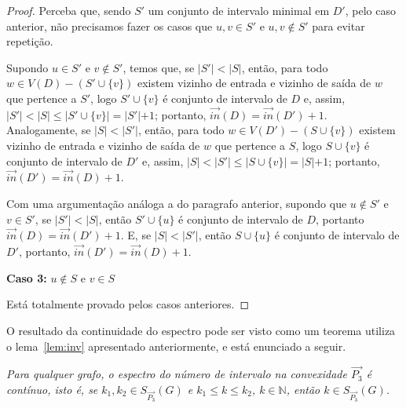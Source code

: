 \begin{proof}
    Perceba que, sendo $S'$ um conjunto de intervalo minimal em $D'$, pelo caso anterior, não precisamos fazer os casos que $u,v\in S'$ e $u,v\notin S'$ para evitar repetição.

    Supondo $u\in S'$ e $v\notin S'$, temos que, se $\lvert S'\lvert < \lvert S\lvert$, então, para todo $w\in V(D)-(S'\cup\{ v \})$ existem vizinho de entrada e vizinho de saída de $w$ que pertence a $S'$, logo $S'\cup \{v\}$ é conjunto de intervalo de $D$ e, assim, $\lvert S' \lvert<\lvert S\lvert \leq \lvert S' \cup \{ v \} \lvert = \lvert S'\lvert +1$; portanto, $\overrightarrow{in}(D)=\overrightarrow{in}(D') +1$. Analogamente, se $\lvert S\lvert < \lvert S'\lvert$, então, para todo $w\in V(D')-(S\cup\{ v \})$ existem vizinho de entrada e vizinho de saída de $w$ que pertence a $S$, logo $S\cup \{v\}$ é conjunto de intervalo de $D'$ e, assim, $\lvert S \lvert<\lvert S'\lvert \leq \lvert S \cup \{ v \} \lvert = \lvert S\lvert +1$; portanto, $\overrightarrow{in}(D')=\overrightarrow{in}(D) +1$.

    Com uma argumentação análoga a do paragrafo anterior, supondo que $u\notin S'$ e $v\in S'$, se $\lvert S'\lvert < \lvert S\lvert$, então $S'\cup \{ u \}$ é conjunto de intervalo de $D$, portanto $\overrightarrow{in}(D)=\overrightarrow{in}(D') +1$. E, se $\lvert S\lvert < \lvert S'\lvert$, então $S\cup \{u\}$ é conjunto de intervalo de $D'$, portanto, $\overrightarrow{in}(D')=\overrightarrow{in}(D) +1$.
    
    \noindent \textbf{Caso 3:} $u \notin S$ e $v \in S$

    Está totalmente provado pelos casos anteriores.
\end{proof}

O resultado da continuidade do espectro pode ser visto como um teorema utiliza o lema~\ref{lem:inv} apresentado anteriormente, e está enunciado a seguir.

\begin{theorem}
    \textit{Para qualquer grafo, o espectro do número de intervalo na convexidade $\overrightarrow{P_3}$ é contínuo, isto é, se $k_1,k_2\in S_{\overrightarrow{P_3}}(G)$ e $k_1\leq k\leq k_2$, $k\in \mathbb{N}$, então $k\in S_{\overrightarrow{P_3}}(G)$.}\label{teo:inv}
\end{theorem}

